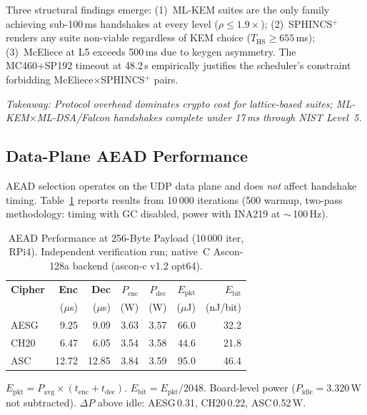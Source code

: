 Three structural findings emerge: (1)~ML-KEM suites are the only
family achieving sub-100\,ms handshakes at every level
($\rho \leq 1.9\times$); (2)~SPHINCS$^+$ renders any suite
non-viable regardless of KEM choice ($T_\text{HS} \geq 655$\,ms);
(3)~McEliece at L5 exceeds 500\,ms due to keygen asymmetry.  The
MC460+SP192 timeout at 48.2\,s empirically justifies the
scheduler's constraint forbidding McEliece$\times$SPHINCS$^+$ pairs.

\emph{Takeaway: Protocol overhead dominates crypto cost for
lattice-based suites; ML-KEM$\times$ML-DSA/Falcon handshakes
complete under 17\,ms through NIST Level~5.}

\subsection{Data-Plane AEAD Performance}
\label{sec:aead}

AEAD selection operates on the UDP data plane and does \emph{not}
affect handshake timing.  Table~\ref{tab:aead} reports results from
10\,000 iterations (500 warmup, two-pass methodology: timing with
GC disabled, power with INA219 at $\sim$\,100\,Hz).

\begin{table}[t]
\centering
\caption{AEAD Performance at 256-Byte Payload (10\,000 iter, RPi4).
  Independent verification run; native~C Ascon-128a backend
  (ascon-c v1.2 opt64).}
\label{tab:aead}
\footnotesize
\begin{tabular}{@{}lrrrrrr@{}}
\toprule
\textbf{Cipher} &
  \textbf{Enc} & \textbf{Dec} &
  \textbf{$P_\text{enc}$} & \textbf{$P_\text{dec}$} &
  \textbf{$E_\text{pkt}$} & \textbf{$E_\text{bit}$} \\
& ($\mu$s) & ($\mu$s) & (W) & (W) & ($\mu$J) & (nJ/bit) \\
\midrule
AESG & 9.25  & 9.09  & 3.63 & 3.57 & 66.0  & 32.2 \\
CH20 & 6.47  & 6.05  & 3.54 & 3.58 & 44.6  & 21.8 \\
ASC  & 12.72 & 12.85 & 3.84 & 3.59 & 95.0  & 46.4 \\
\bottomrule
\end{tabular}
\begin{tablenotes}
\footnotesize
\item $E_\text{pkt} = P_\text{avg} \times (t_\text{enc} + t_\text{dec})$.
  $E_\text{bit} = E_\text{pkt} / 2048$.
  Board-level power ($P_\text{idle} = 3.320$\,W not subtracted).
  $\Delta P$ above idle: AESG\,0.31, CH20\,0.22, ASC\,0.52\,W.
\end{tablenotes}
\end{table}

